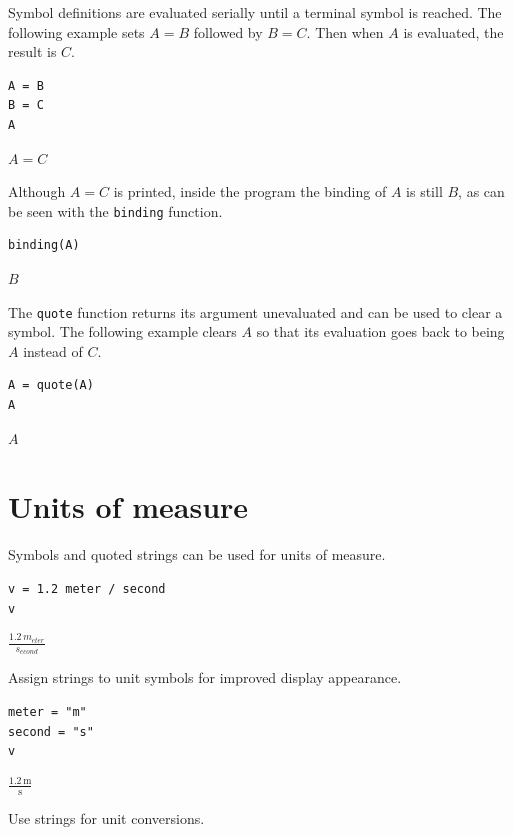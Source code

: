 \documentclass[12pt]{article}
\begin{document}
\bigskip

Symbol definitions are evaluated serially until a terminal symbol is reached.
The following example sets $A=B$ followed by $B=C$.
Then when $A$ is evaluated, the result is $C$.

{\color{blue}
\begin{verbatim}
A = B
B = C
A
\end{verbatim}
}

$\displaystyle A=C$

\bigskip

Although $A=C$ is printed,
inside the program the binding of $A$ is still $B$, as can be seen with
the \verb$binding$ function.

{\color{blue}
\begin{verbatim}
binding(A)
\end{verbatim}
}

$\displaystyle B$

\bigskip

The \verb$quote$ function returns its argument unevaluated
and can be used to clear a symbol.
The following example clears $A$ so that its evaluation goes back to
being $A$ instead of $C$.

{\color{blue}
\begin{verbatim}
A = quote(A)
A
\end{verbatim}
}

$\displaystyle A$

\newpage

\section{Units of measure}

Symbols and quoted strings can be used for units of measure.

{\color{blue}
\begin{verbatim}
v = 1.2 meter / second
v
\end{verbatim}}

$\displaystyle\frac{1.2\,m_{eter}}{s_{econd}}$

\bigskip
Assign strings to unit symbols for improved display appearance.

{\color{blue}
\begin{verbatim}
meter = "m"
second = "s"
v
\end{verbatim}}

$\displaystyle\frac{1.2\,\text{m}}{\text{s}}$

\iffalse
\bigskip
Use strings for unit conversions.
\end{document}
